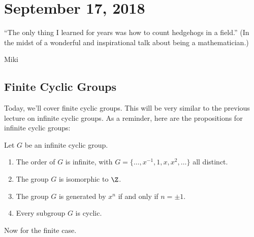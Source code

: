 \section{September 17, 2018}

\epigraph{``The only thing I learned for years was how to count hedgehogs in a field.'' (In the midst of a wonderful and inspirational talk about being a mathematician.)}{Miki}

\subsection{Finite Cyclic Groups}

Today, we'll cover finite cyclic groups. This will be very similar to the previous lecture on infinite cyclic groups. As a reminder, here are the propositions for infinite cyclic groups:

\begin{proposition}
Let $G$ be an infinite cyclic group.
\begin{enumerate}
\item The order of $G$ is infinite, with $G = \{\dotsc,x^{-1},1,x,x^2,\dotsc\}$ all distinct.
\item The group $G$ is isomorphic to $\Z$.
\item The group $G$ is generated by $x^n$ if and only if $n = \pm 1$.
\item Every subgroup $G$ is cyclic.
\end{enumerate}
\end{proposition}

Now for the finite case. 

